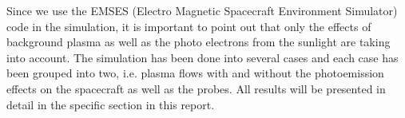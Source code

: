 Since we use the EMSES (Electro Magnetic Spacecraft Environment Simulator) code \citep{miyake_plasma_2013} in the
simulation, it is important to point out that only the effects of background plasma as
well as the photo electrons from the sunlight are taking into account. The simulation
has been done into several cases and each case has been grouped into two, i.e. plasma
flows with and without the photoemission effects on the spacecraft as well as the probes.
All  results will be presented in detail in the specific section in this report.
